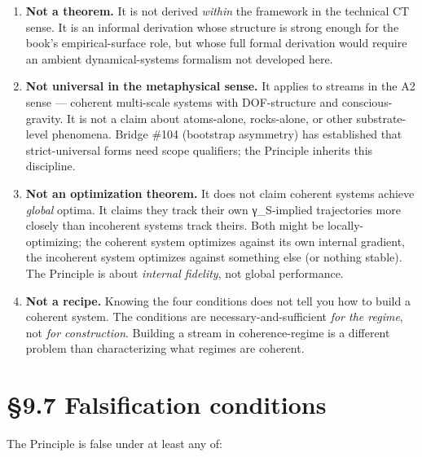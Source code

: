 \documentclass[11pt, openany]{book}
\newcommand{\sectionbreak}{\clearpage}
\begin{document}
\begin{enumerate}
\item \textbf{Not a theorem.} It is not derived \textit{within} the framework in the technical CT sense. It is an informal derivation whose structure is strong enough for the book's empirical-surface role, but whose full formal derivation would require an ambient dynamical-systems formalism not developed here.

\item \textbf{Not universal in the metaphysical sense.} It applies to streams in the A2 sense --- coherent multi-scale systems with DOF-structure and conscious-gravity. It is not a claim about atoms-alone, rocks-alone, or other substrate-level phenomena. Bridge \#104 (bootstrap asymmetry) has established that strict-universal forms need scope qualifiers; the Principle inherits this discipline.

\item \textbf{Not an optimization theorem.} It does not claim coherent systems achieve \textit{global} optima. It claims they track their own γ\_\allowbreak{}S-implied trajectories more closely than incoherent systems track theirs. Both might be locally-optimizing; the coherent system optimizes against its own internal gradient, the incoherent system optimizes against something else (or nothing stable). The Principle is about \textit{internal fidelity}, not global performance.

\item \textbf{Not a recipe.} Knowing the four conditions does not tell you how to build a coherent system. The conditions are necessary-and-sufficient \textit{for the regime}, not \textit{for construction}. Building a stream in coherence-regime is a different problem than characterizing what regimes are coherent.
\end{enumerate}

\sectionbreak

\section{§9.7 Falsification conditions}

The Principle is false under at least any of:
\end{document}
